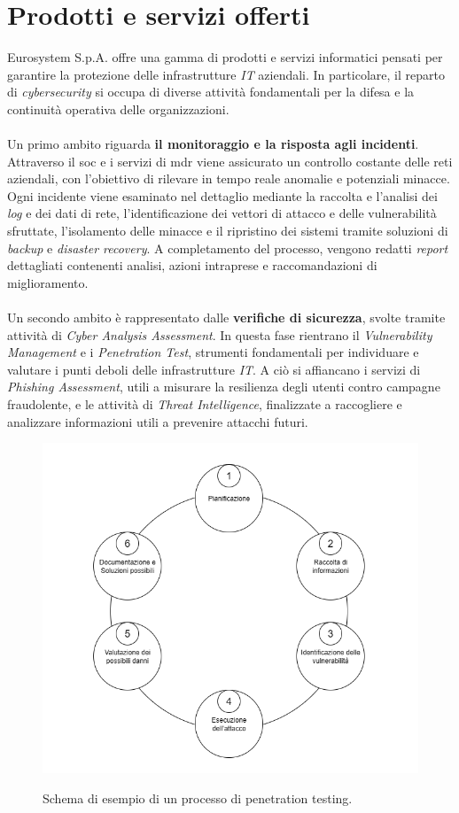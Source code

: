 \section{Prodotti e servizi offerti}  
Eurosystem S.p.A. offre una gamma di prodotti e servizi informatici pensati per garantire la protezione delle infrastrutture \textit{IT} aziendali. In particolare, il reparto di \textit{cybersecurity} si occupa di diverse attività fondamentali per la difesa e la continuità operativa delle organizzazioni.\\\\  
Un primo ambito riguarda \textbf{il monitoraggio e la risposta agli incidenti}. Attraverso il \gls{soc} e i servizi di \gls{mdr} viene assicurato un controllo costante delle reti aziendali, con l'obiettivo di rilevare in tempo reale anomalie e potenziali minacce. Ogni incidente viene esaminato nel dettaglio mediante la raccolta e l'analisi dei \textit{log} e dei dati di rete, l'identificazione dei vettori di attacco e delle vulnerabilità sfruttate, l'isolamento delle minacce e il ripristino dei sistemi tramite soluzioni di \textit{backup} e \textit{disaster recovery}. A completamento del processo, vengono redatti \textit{report} dettagliati contenenti analisi, azioni intraprese e raccomandazioni di miglioramento.\\\\  
Un secondo ambito è rappresentato dalle \textbf{verifiche di sicurezza}, svolte tramite attività di \textit{Cyber Analysis Assessment}. In questa fase rientrano il \textit{Vulnerability Management} e i \textit{Penetration Test}, strumenti fondamentali per individuare e valutare i punti deboli delle infrastrutture \textit{IT}. A ciò si affiancano i servizi di \textit{Phishing Assessment}, utili a misurare la resilienza degli utenti contro campagne fraudolente, e le attività di \textit{Threat Intelligence}, finalizzate a raccogliere e analizzare informazioni utili a prevenire attacchi futuri.  
\begin{figure}[H]
    \centering
    \includegraphics[alt={Schema Penetration Test}, width=0.95\columnwidth]{img/Pen_test.png}
    \caption{Schema di esempio di un processo di penetration testing.}
    \label{fig:pen_test}    
\end{figure}  
